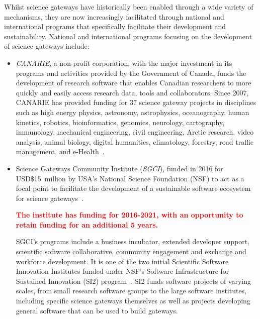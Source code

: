 \documentclass[review]{elsarticle}
\newcommand{\changedtext}[1]{
	\textcolor{red}{\textbf{#1}}
}
\begin{document}
Whilst science gateways have historically been enabled through a wide variety of mechanisms, they are now increasingly facilitated through national and international programs that specifically facilitate their development and sustainability. 
National and international programs focusing on the development of science gateways include:

\begin{itemize}

\item \emph{CANARIE}, a non-profit corporation, with the major investment in its programs and activities provided by the Government of Canada, funds the development of research software that enables Canadian researchers to more quickly and easily access research data, tools and collaborators. Since 2007, CANARIE has provided funding for 37 science gateway projects in disciplines such as high energy physics, astronomy, astrophysics, oceanography, human kinetics, robotics, bioinformatics, genomics, neurology, cartography, immunology, mechanical engineering, civil engineering, Arctic research, video analysis, animal biology, digital humanities, climatology, forestry, road traffic management, and e-Health~\cite{canarie-15}. 

\item Science Gateways Community Institute (\emph{SGCI}), funded in 2016 for \mbox{USD\$15 million} by USA's National Science Foundation (NSF) to act as a focal point to facilitate the development of a sustainable software ecosystem for science gateways~\cite{sgci-16}.
\changedtext{The institute has funding for 2016-2021, with an  opportunity to retain funding for an additional 5 years.}
 SGCI's programs include a business incubator, extended developer support, scientific software collaborative, community engagement and exchange and workforce development. It is one of the two initial Scientific Software Innovation Institutes funded under NSF's Software Infrastructure for Sustained Innovation (SI2) program~\cite{nsf-si-17}. SI2 funds software projects of varying scales, from small research software groups to the large software institutes, including specific science gateways themselves as well as projects developing general software that can be used to build gateways. 


\end{itemize}
\end{document}
